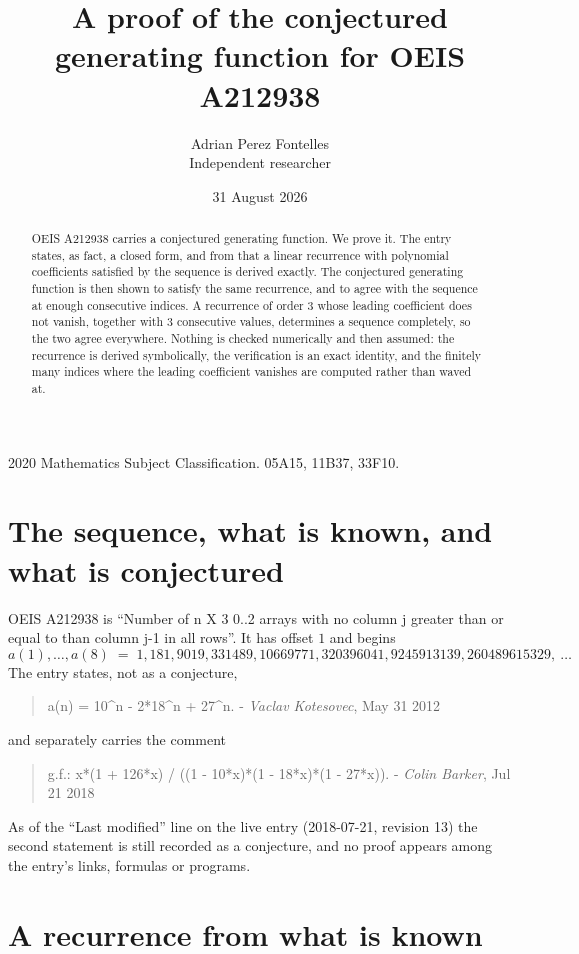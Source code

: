 \documentclass[11pt,a4paper]{article}
\title{A proof of the conjectured generating function for OEIS A212938}
\author{Adrian Perez Fontelles\\ \small Independent researcher}
\date{31 August 2026}
\theoremstyle{plain}
\theoremstyle{definition}
\begin{document}
\maketitle

\begin{abstract}
OEIS A212938 carries a conjectured generating function. We prove it. The entry states, as fact,
a closed form, and from that a linear recurrence with polynomial coefficients satisfied by
the sequence is derived exactly. The conjectured generating function is then shown to satisfy the
same recurrence, and to agree with the sequence at enough consecutive indices. A recurrence
of order $3$ whose leading coefficient does not vanish, together with $3$
consecutive values, determines a sequence completely, so the two agree everywhere. Nothing
is checked numerically and then assumed: the recurrence is derived symbolically, the
verification is an exact identity, and the finitely many indices where the leading
coefficient vanishes are computed rather than waved at.
\end{abstract}

\noindent\small 2020 Mathematics Subject Classification. 05A15, 11B37, 33F10.\normalsize

\section{The sequence, what is known, and what is conjectured}

OEIS A212938 is ``Number of n X 3 0..2 arrays with no column j greater than or equal to than column j-1 in all rows''. It has offset $1$ and begins
\[
a(1),\dots,a(8)\;=\;1, 181, 9019, 331489, 10669771, 320396041, 9245913139, 260489615329,\ \dots
\]
The entry states, not as a conjecture,
\begin{quote}\small
a(n) = 10\textasciicircum{}n - 2*18\textasciicircum{}n + 27\textasciicircum{}n. - \emph{Vaclav Kotesovec}, May 31 2012
\end{quote}
and separately carries the comment
\begin{quote}\small
g.f.: x*(1 + 126*x) / ((1 - 10*x)*(1 - 18*x)*(1 - 27*x)). - \emph{Colin Barker}, Jul 21 2018
\end{quote}
As of the ``Last modified'' line on the live entry (2018-07-21, revision 13) the second
statement is still recorded as a conjecture, and no proof appears among the entry's links,
formulas or programs.

\section{A recurrence from what is known}
\end{document}
